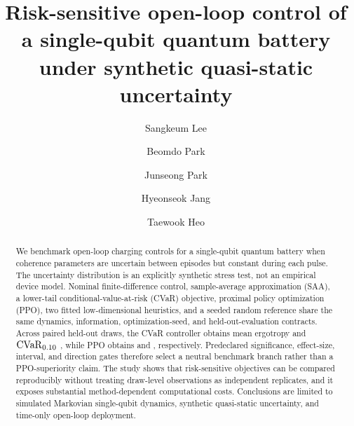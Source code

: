 \documentclass[preprint,aps,pra,superscriptaddress,longbibliography]{revtex4-2}
\begin{document}
\title{Risk-sensitive open-loop control of a single-qubit quantum battery under synthetic quasi-static uncertainty}

\author{Sangkeum Lee}
\author{Beomdo Park}
\author{Junseong Park}
\author{Hyeonseok Jang}
\author{Taewook Heo}

\begin{abstract}
We benchmark open-loop charging controls for a single-qubit quantum battery when coherence parameters are uncertain between episodes but constant during each pulse.  The uncertainty distribution is an explicitly synthetic stress test, not an empirical device model.  Nominal finite-difference control, sample-average approximation (SAA), a lower-tail conditional-value-at-risk (CVaR) objective, proximal policy optimization (PPO), two fitted low-dimensional heuristics, and a seeded random reference share the same dynamics, information, optimization-seed, and held-out-evaluation contracts.  Across paired held-out draws, the CVaR controller obtains mean ergotropy \PVMethodCvarMeanEstimate{} and $\mathrm{CVaR}_{0.10}$ \PVMethodCvarCvarZeroOneEstimate{}, while PPO obtains \PVMethodPpoMeanEstimate{} and \PVMethodPpoCvarZeroOneEstimate{}, respectively.  Predeclared significance, effect-size, interval, and direction gates therefore select a neutral benchmark branch rather than a PPO-superiority claim.  The study shows that risk-sensitive objectives can be compared reproducibly without treating draw-level observations as independent replicates, and it exposes substantial method-dependent computational costs.  Conclusions are limited to simulated Markovian single-qubit dynamics, synthetic quasi-static uncertainty, and time-only open-loop deployment.
\end{abstract}

\maketitle
\end{document}

